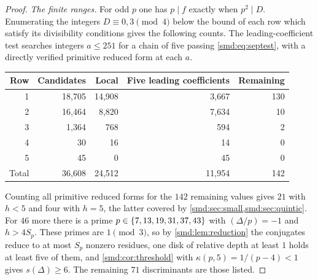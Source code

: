 \begin{proof}
\emph{The finite ranges.} For odd $p$ one has $p\mid f$ exactly when $p^2\mid D$.
Enumerating the integers $D\equiv0,3\pmod4$ below the bound of each row which satisfy its
divisibility conditions gives the following counts. The leading-coefficient test searches
integers $a\le251$ for a chain of five passing \eqref{smd:eq:septest}, with a directly
verified primitive reduced form at each $a$.
\begin{center}
\begin{tabular}{rrrrr}
\toprule
Row & Candidates & Local & Five leading coefficients & Remaining\\
\midrule
1 &18,705&14,908&3,667&130\\
2 &16,464& 8,820&7,634&10\\
3 & 1,364&   768&  594&2\\
4 &    30&    16&   14&0\\
5 &    45&     0&   45&0\\
\midrule
Total &36,608&24,512&11,954&142\\
\bottomrule
\end{tabular}
\end{center}
Counting all primitive reduced forms for the $142$ remaining values gives $21$ with
$h<5$ and four with $h=5$, the latter covered by \cref{smd:sec:small,smd:sec:quintic}. For
$46$ more there is a prime $p\in\{7,13,19,31,37,43\}$ with $(\Delta/p)=-1$ and
$h>4S_p$. These primes are $1\pmod3$, so by \cref{smd:lem:reduction} the conjugates
reduce to at most $S_p$ nonzero residues, one disk of relative depth at least $1$ holds at
least five of them, and \cref{smd:cor:threshold} with $\kappa(p,5)=1/(p-4)<1$ gives
$s(\Delta)\ge6$. The remaining $71$ discriminants are those listed.
\end{proof}


